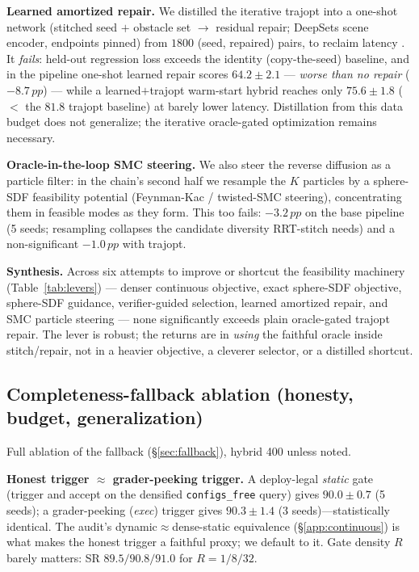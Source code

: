 \documentclass[10pt,twocolumn]{article}
\newcommand{\pp}{\,pp}
\begin{document}
\noindent\textbf{Learned amortized repair.} We distilled the iterative trajopt into a
one-shot network (stitched seed $+$ obstacle set $\to$ residual repair; DeepSets scene
encoder, endpoints pinned) from $1800$ (seed, repaired) pairs, to reclaim latency
\cite{presto2025}. It \emph{fails}: held-out regression loss exceeds the identity
(copy-the-seed) baseline, and in the pipeline one-shot learned repair scores
$64.2\pm2.1$ --- \emph{worse than no repair} ($-8.7\pp$) --- while a learned$+$trajopt
warm-start hybrid reaches only $75.6\pm1.8$ ($<$ the $81.8$ trajopt baseline) at barely
lower latency. Distillation from this data budget does not generalize; the iterative
oracle-gated optimization remains necessary.

\noindent\textbf{Oracle-in-the-loop SMC steering.} We also steer the reverse diffusion as a particle filter: in the chain's second half we resample the $K$ particles by a sphere-SDF feasibility potential (Feynman-Kac / twisted-SMC steering), concentrating them in feasible modes as they form. This too fails: $-3.2\pp$ on the base pipeline (5 seeds; resampling collapses the candidate diversity RRT-stitch needs) and a non-significant $-1.0\pp$ with trajopt. 

\noindent\textbf{Synthesis.} Across six attempts to improve or shortcut the feasibility
machinery (Table~\ref{tab:levers}) --- denser continuous objective, exact sphere-SDF
objective, sphere-SDF guidance, verifier-guided selection, learned amortized repair, and
SMC particle steering --- none significantly exceeds plain oracle-gated trajopt repair. The lever is robust; the returns are in \emph{using}
the faithful oracle inside stitch/repair, not in a heavier objective, a cleverer
selector, or a distilled shortcut.

\subsection{Completeness-fallback ablation (honesty, budget, generalization)}
\label{app:fallback}
Full ablation of the fallback (\S\ref{sec:fallback}), hybrid 400 unless noted.

\noindent\textbf{Honest trigger $\approx$ grader-peeking trigger.} A deploy-legal
\emph{static} gate (trigger and accept on the densified \texttt{configs\_free} query)
gives $90.0{\pm}0.7$ (5 seeds); a grader-peeking (\emph{exec}) trigger gives $90.3{\pm}1.4$
(3 seeds)---statistically identical. The audit's dynamic$\approx$dense-static equivalence
(\S\ref{app:continuous}) is what makes the honest trigger a faithful proxy; we default to
it. Gate density $R$ barely matters: SR $89.5/90.8/91.0$ for $R{=}1/8/32$.
\end{document}
